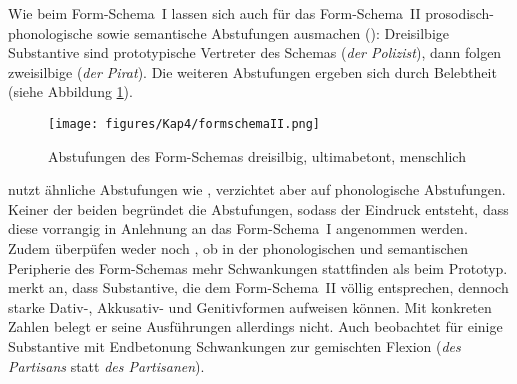 Wie beim Form-Schema~I lassen sich auch für das Form-Schema~II prosodisch-phonologische sowie semantische Abstufungen ausmachen (\cite[61--62]{Krischke.2012}): Dreisilbige Substantive sind prototypische Vertreter des Schemas (\textit{der Polizist}), dann folgen zweisilbige (\textit{der Pirat}). Die weiteren Abstufungen ergeben sich durch Belebtheit (siehe Abbildung \ref{fig2llo}).\pagebreak

\begin{figure}
\texttt{[image: figures/Kap4/formschemaII.png]}  
\caption{Abstufungen des Form-Schemas dreisilbig, ultimabetont, menschlich}
\label{fig2llo}
\end{figure}

\textcite[175]{Kopcke.1995} nutzt ähnliche Abstufungen wie \textcite[61--62]{Krischke.2012}, verzichtet aber auf phonologische Abstufungen. Keiner der beiden begründet die Abstufungen, sodass der Eindruck entsteht, dass diese vorrangig in Anlehnung an das Form-Schema~I angenommen werden. Zudem überpüfen weder \textcite{Kopcke.1995} noch \textcite{Krischke.2012}, ob in der phonologischen und semantischen Peripherie des Form-Schemas mehr Schwankungen stattfinden als beim Prototyp. \textcite[113]{Thieroff.2003} merkt an, dass Substantive, die dem Form-Schema~II völlig entsprechen, dennoch starke Dativ-, Akkusativ- und Genitivformen aufweisen können. Mit konkreten Zahlen belegt er seine Ausführungen allerdings nicht. Auch \textcite[105]{Bittner.20031991} beobachtet für einige Substantive mit Endbetonung Schwankungen zur gemischten Flexion (\textit{des Partisans} statt \textit{des Partisanen}). 

